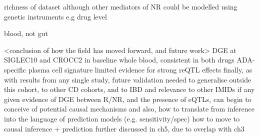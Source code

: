 \begin{outline}
        richness of dataset 
        although
        other mediators of NR could be modelled using genetic instruments e.g drug level

    \2 blood, not gut

\1 <conclusion of how the field has moved forward, and future work>
    \2 DGE at SIGLEC10 and CROCC2 in baseline whole blood, consistent in both drugs
    \2 ADA-specific plasma cell signature
    \2 limited evidence for strong reQTL effects
    \2 finally, as with results from any single study, future validation needed to generalise outside this cohort, to other CD cohorts, and to IBD and relevance to other IMIDs if any
    \2 given evidence of DGE between R/NR, and the presence of eQTLs, can begin to conceive of potential causal mechanisms 
    \2 and also, how to translate from inference into the language of prediction models (e.g. sensitivity/spec)
    \2 how to move to causal inference + prediction further discussed in ch5, due to overlap with ch3


\end{outline}
